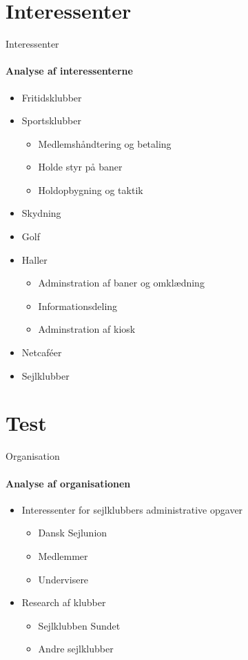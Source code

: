 \section{Interessenter}
\begin{frame}{Interessenter}
	\framesubtitle{Analyse af interessenterne}
	
	\begin{itemize}
		\item Fritidsklubber
		\item Sportsklubber
		\begin{itemize}
			\item Medlemshåndtering og betaling
			\item Holde styr på baner
			\item Holdopbygning og taktik
		\end{itemize}
		\item Skydning
		\item Golf
		\item Haller
		\begin{itemize}
			\item Adminstration af baner og omklædning
			\item Informationsdeling
			\item Adminstration af kiosk	
		\end{itemize}
		\item Netcaféer
		\item Sejlklubber
	\end{itemize}


\end{frame}

\section{Test}
\begin{frame}{Organisation}
	\framesubtitle{Analyse af organisationen}
		\begin{itemize}
			\item Interessenter for sejlklubbers administrative opgaver
			\begin{itemize}
				\item Dansk Sejlunion
				\item Medlemmer
				\item Undervisere
			\end{itemize}
			\item Research af klubber
			\begin{itemize}
				\item Sejlklubben Sundet
				\item Andre sejlklubber
			\end{itemize}
		\end{itemize}

\end{frame}
